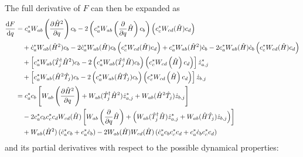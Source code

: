 \documentclass[12pt]{article}
\newcommand{\hc}{^\dagger}
\begin{document}
	The full derivative of $F$ can then be expanded as
	\begin{align}
	\dv{F}{q} &= c_a^* W_{ab}\left(\pdv{\hat{H}^2}{q}\right)c_b - 2\left(c_a^* W_{ab}\left(\pdv{q}\hat{H}\right)c_b\right)\left(c_c^* W_{cd}(\hat{H})c_d\right)\nonumber\\
	&\quad + \dot{c}_a^* W_{ab}(\hat{H}^2)c_b - 2\dot{c}_a^* W_{ab}(\hat{H})c_b \left(c_c^*W_{cd}(\hat{H})c_d\right) + c_a^* W_{ab}(\hat{H}^2)\dot{c}_b - 2c_a^* W_{ab}(\hat{H})\dot{c}_b \left(c_c^*W_{cd}(\hat{H})c_d\right)  \nonumber\\
	&\quad + \left[c_a^* W_{ab}(\hat{T}_j\hc\hat{H}^2)c_b - 2\left(c_a^* W_{ab}(\hat{T}_j\hc\hat{H})c_b\right)\left(c_c^* W_{cd}\left(\hat{H}\right)c_d\right) \right] \dot{z}_{a,j}^* \nonumber\\
	&\quad + \left[c_a^* W_{ab}(\hat{H}^2\hat{T}_j)c_b - 2\left(c_a^* W_{ab}(\hat{H}\hat{T}_j)c_b\right)\left(c_c^* W_{cd}\left(\hat{H}\right)c_d\right) \right] \dot{z}_{b,j} \\
	&= c_a^* c_b \left[  W_{ab}\left(\pdv{\hat{H}^2}{q}\right) + W_{ab}(\hat{T}_j\hc \hat{H}^2) \dot{z}_{a,j}^* + W_{ab}(\hat{H}^2 \hat{T}_j) \dot{z}_{b,j}\right] \nonumber\\
	&\quad -2 c_a^* c_b c_c^* c_d W_{cd}(\hat{H}) \left[ W_{ab}\left(\pdv{q}\hat{H}\right) + \left( W_{ab}(\hat{T}_j\hc \hat{H}) \dot{z}_{a,j}^* + W_{ab}(\hat{H} \hat{T}_j) \dot{z}_{b,j} \right) \right] \nonumber\\
	&\quad + W_{ab}(\hat{H}^2) \left(\dot{c}_a^* c_b + c_a^* \dot{c}_b\right) - 2 W_{ab}(\hat{H}) W_{cd}(\hat{H}) \left( \dot{c}_a^* c_b c_c^* c_d + c_a^* \dot{c}_b c_c^* c_d \right)
	\end{align}
	and its partial derivatives with respect to the possible dynamical properties:
\end{document}
